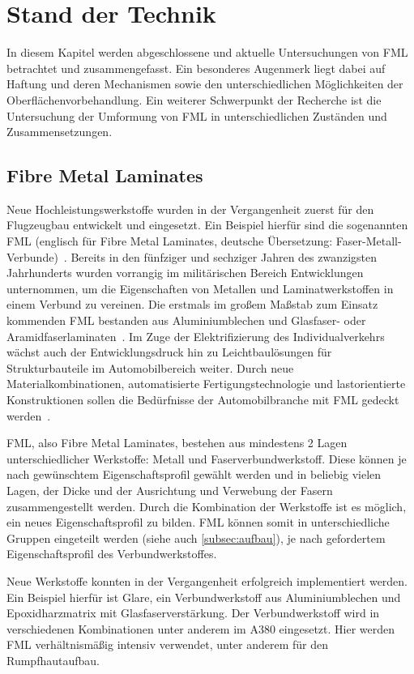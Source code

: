 \chapter{Stand der Technik}\label{ch:stand}

In diesem Kapitel werden abgeschlossene und aktuelle Untersuchungen von FML betrachtet und zusammengefasst.
Ein besonderes Augenmerk liegt dabei auf Haftung und deren Mechanismen sowie den unterschiedlichen Möglichkeiten der Oberflächenvorbehandlung.
Ein weiterer Schwerpunkt der Recherche ist die Untersuchung der Umformung von FML in unterschiedlichen Zuständen und Zusammensetzungen.


\section{Fibre Metal Laminates}\label{sec:FML}

Neue Hochleistungswerkstoffe wurden in der Vergangenheit zuerst für den Flugzeugbau entwickelt und eingesetzt.
Ein Beispiel hierfür sind die sogenannten FML (englisch für Fibre Metal Laminates, deutsche Übersetzung: Faser-Metall-Verbunde)~.
Bereits in den fünfziger und sechziger Jahren des zwanzigsten Jahrhunderts wurden vorrangig im militärischen Bereich Entwicklungen unternommen, um die Eigenschaften von Metallen und Laminatwerkstoffen in einem Verbund zu vereinen.
Die erstmals im großem Maßstab zum Einsatz kommenden FML bestanden aus Aluminiumblechen und Glasfaser- oder Aramidfaserlaminaten~\cite{Vogelesang.2000}.
Im Zuge der Elektrifizierung des Individualverkehrs wächst auch der Entwicklungsdruck hin zu Leichtbaulösungen für Strukturbauteile im Automobilbereich weiter.
Durch neue Materialkombinationen, automatisierte Fertigungstechnologie und lastorientierte Konstruktionen sollen die Bedürfnisse der Automobilbranche mit FML gedeckt werden~\cite{Wollmann.2018}.

FML, also Fibre Metal Laminates, bestehen aus mindestens 2 Lagen unterschiedlicher Werkstoffe: Metall und Faserverbundwerkstoff.
Diese können je nach gewünschtem Eigenschaftsprofil gewählt werden und in beliebig vielen Lagen, der Dicke und der Ausrichtung und Verwebung der Fasern zusammengestellt werden.
Durch die Kombination der Werkstoffe ist es möglich, ein neues Eigenschaftsprofil zu bilden.
FML können somit in unterschiedliche Gruppen eingeteilt werden (siehe auch \autoref{subsec:aufbau}), je nach gefordertem Eigenschaftsprofil des Verbundwerkstoffes.

Neue Werkstoffe konnten in der Vergangenheit erfolgreich implementiert werden.
Ein Beispiel hierfür ist Glare, ein Verbundwerkstoff aus Aluminiumblechen und Epoxidharzmatrix mit Glasfaserverstärkung.
Der Verbundwerkstoff wird in verschiedenen Kombinationen unter anderem im A380 eingesetzt.
Hier werden FML verhältnismäßig intensiv verwendet, unter anderem für den Rumpfhautaufbau\cite{Airbus.05.04.2021, Vlot.2001}.

